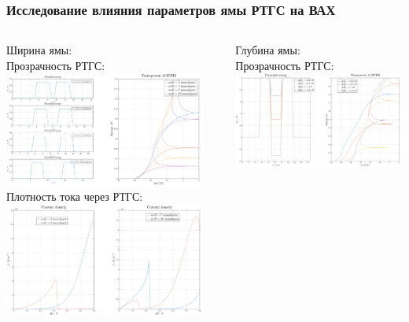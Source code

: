 \documentclass[10pt,pdf,hyperref={unicode},aspectratio={169}]{beamer}
\begin{document}
\begin{frame}
	\frametitle{Исследование влияния параметров ямы РТГС на ВАХ}
	\begin{columns}
		{\color{blue} Ширина ямы:}\\
		{\color{red} Прозрачность РТГС:}
	   	\includegraphics[width=.8\linewidth,center]{assets/qwwt}\\
		{\color{red} Плотность тока через РТГС:}
	   	\includegraphics[width=.8\linewidth,center]{assets/qwwj}
		\rule[-55mm]{0.2ex}{75mm}
		{\color{blue} Глубина ямы:}\\
		{\color{red}\small Прозрачность РТГС:}\\
	   	\includegraphics[width=.8\linewidth,center]{assets/qwht}\\

\end{columns}
\end{frame}
\end{document}
